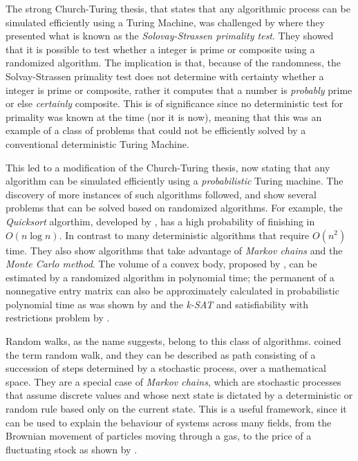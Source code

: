 \documentclass[../../dissertation.tex]{subfiles}
\begin{document}
The strong Church-Turing thesis, that states that any algorithmic process can
be simulated efficiently using a Turing Machine, was challenged by
\cite{solvaystrassen77} where they presented what is known as the
\textit{Solovay-Strassen primality test}. They showed that it is possible to
test whether a integer is prime or composite using a randomized algorithm. The
implication is that, because of the randomness, the Solvay-Strassen primality
test does not determine with certainty whether a integer is prime or composite,
rather it computes that a number is \textit{probably} prime or else
\textit{certainly} composite. This is of significance since no deterministic
test for primality was known at the time (nor it is now), meaning that this was
an example of a class of problems that could not be efficiently solved by a
conventional deterministic Turing Machine.\par

This led to a modification of the Church-Turing thesis, now stating that any
algorithm can be simulated efficiently using a \textit{probabilistic} Turing
machine. The discovery of more instances of such algorithms followed,
\cite{motwani1995} and \cite{papadimitrious1994} show several problems that can
be solved based on randomized algorithms. For example, the \textit{Quicksort}
algorthim, developed by \cite{hoare61}, has a high probability of finishing in
$O(n \log{n})$. In contrast to many deterministic algorithms that require
$O(n^2)$ time. They also show algorithms that take advantage of \textit{Markov
chains} and the \textit{Monte Carlo method}. The volume of a convex body,
proposed by \cite{dyer1991}, can be estimated by a randomized algorithm in
polynomial time; the permanent of a nonnegative entry matrix can also be
approximately calculated in probabilistic polynomial time as was shown by
\cite{jerrum2001} and the \textit{k-SAT} and satisfiability with restrictions
problem by \cite{schoning1999}. \par

Random walks, as the name suggests, belong to this class of algorithms.
\cite{kpearson1905} coined the term random walk, and they can be described as
path consisting of a succession of steps determined by a stochastic process,
over a mathematical space. They are a special case of \textit{Markov chains},
which are stochastic processes that assume discrete values and whose next state
is dictated by a deterministic or random rule based only on the current state.
This is a useful framework, since it can be used to explain the behaviour of
systems across many fields, from the Brownian movement of particles moving
through a gas, to the price of a fluctuating stock as shown by
\cite{cootner67}.\par
\end{document}
